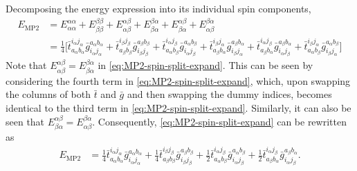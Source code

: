 \documentclass[11pt,oneside]{book}
\begin{document}
Decomposing the energy expression into its individual spin components,
\begin{align}
    E_{\text{MP2}} &= E_{\alpha \alpha}^{\alpha \alpha}
    + E_{\beta \beta}^{\beta \beta}
    + E_{\alpha \beta}^{\alpha \beta}
    + E_{\beta \alpha}^{\beta \alpha}
    + E_{\beta \alpha}^{\alpha \beta}
    + E_{\alpha \beta}^{\beta \alpha}\label{eq:emp2-partitioned} \\
    &= \frac{1}{4} \biggl[ \bar{t}_{a_\alpha b_\alpha}^{i_\alpha j_\alpha} \bar{g}_{i_\alpha j_\alpha}^{a_\alpha b_\alpha}
    + \bar{t}_{a_\beta b_\beta}^{i_\beta j_\beta} \bar{g}_{i_\beta j_\beta}^{a_\beta b_\beta}
    +  \bar{t}_{a_\alpha b_\beta}^{i_\alpha j_\beta} \bar{g}_{i_\alpha j_\beta}^{a_\alpha b_\beta} 
    +  \bar{t}_{a_\beta b_\alpha}^{i_\beta j_\alpha} \bar{g}_{i_\beta j_\alpha}^{a_\beta b_\alpha} 
    + \bar{t}_{a_\beta b_\alpha}^{i_\alpha j_\beta} \bar{g}_{i_\alpha j_\beta}^{a_\beta b_\alpha}
    + \bar{t}_{a_\alpha b_\beta}^{i_\beta j_\alpha} \bar{g}_{i_\beta j_\alpha}^{a_\alpha b_\beta} \biggr]
    \label{eq:MP2-spin-split-expand}
\end{align}
Note that $E_{\alpha \beta}^{\alpha \beta} = E_{\beta \alpha}^{\beta \alpha}$ in \cref{eq:MP2-spin-split-expand}. This can be seen by considering the fourth term in \cref{eq:MP2-spin-split-expand}, which, upon swapping the columns of both $\bar{t}$ and $\bar{g}$ and then swapping the dummy indices, becomes identical to the third term in \cref{eq:MP2-spin-split-expand}. Similarly, it can also be seen that $E_{\beta \alpha}^{\alpha \beta}= E_{\alpha \beta}^{\beta \alpha}$. Consequently, \cref{eq:MP2-spin-split-expand} can be rewritten as
\begin{align}
    E_{\text{MP2}} 
    &= \frac{1}{4} \bar{t}_{a_\alpha b_\alpha}^{i_\alpha j_\alpha} \bar{g}_{i_\alpha j_\alpha}^{a_\alpha b_\alpha}
     + \frac{1}{4} \bar{t}_{a_\beta b_\beta}^{i_\beta j_\beta} \bar{g}_{i_\beta j_\beta}^{a_\beta b_\beta} 
     + \frac{1}{2} \bar{t}_{a_\alpha b_\beta}^{i_\alpha j_\beta} \bar{g}_{i_\alpha j_\beta}^{a_\alpha b_\beta} 
     + \frac{1}{2} \bar{t}_{a_\beta b_\alpha}^{i_\alpha j_\beta} \bar{g}_{i_\alpha j_\beta}^{a_\beta b_\alpha}.
         \label{eq:MP2-spin-split-compact}
\end{align}
\end{document}
